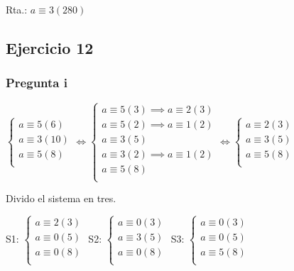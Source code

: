 Rta.: $ a\equiv 3(280) $

\subsection{Ejercicio 12}

\subsubsection{Pregunta i}

$ \begin{cases}
    a\equiv 5(6) \\
    a\equiv 3(10) \\
    a\equiv 5(8) \\
\end{cases} 
\iff \begin{cases}
    a\equiv 5(3) \implies a\equiv 2(3) \\
    a\equiv 5(2) \implies a\equiv 1(2) \\
    a\equiv 3(5) \\
    a\equiv 3(2) \implies a\equiv 1(2) \\
    a\equiv 5(8) \\
\end{cases}
\iff \begin{cases}
    a\equiv 2(3) \\
    a\equiv 3(5) \\
    a\equiv 5(8) \\
\end{cases} $

Divido el sistema en tres.

S1: $ \begin{cases}
    a\equiv 2(3) \\
    a\equiv 0(5) \\
    a\equiv 0(8) \\
\end{cases} $
S2: $ \begin{cases}
    a\equiv 0(3) \\
    a\equiv 3(5) \\
    a\equiv 0(8) \\
\end{cases} $
S3: $ \begin{cases}
    a\equiv 0(3) \\
    a\equiv 0(5) \\
    a\equiv 5(8) \\
\end{cases} $


